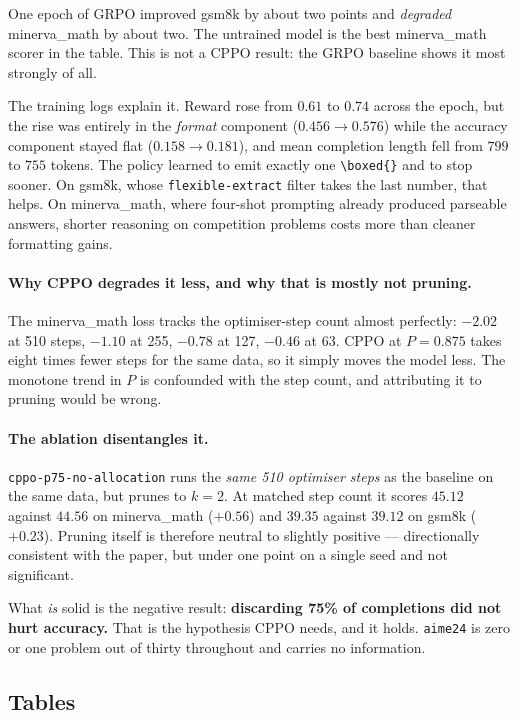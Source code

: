 \documentclass[11pt,a4paper]{article}
\begin{document}
One epoch of GRPO improved gsm8k by about two points and \emph{degraded}
minerva\_math by about two. The untrained model is the best minerva\_math
scorer in the table. This is not a CPPO result: the GRPO baseline shows it most
strongly of all.

The training logs explain it. Reward rose from $0.61$ to $0.74$ across the
epoch, but the rise was entirely in the \emph{format} component
($0.456 \to 0.576$) while the accuracy component stayed flat
($0.158 \to 0.181$), and mean completion length fell from $799$ to $755$
tokens. The policy learned to emit exactly one \verb|\boxed{}| and to stop
sooner. On gsm8k, whose \texttt{flexible-extract} filter takes the last number,
that helps. On minerva\_math, where four-shot prompting already produced
parseable answers, shorter reasoning on competition problems costs more than
cleaner formatting gains.

\paragraph{Why CPPO degrades it less, and why that is mostly not pruning.} The
minerva\_math loss tracks the optimiser-step count almost perfectly: $-2.02$ at
510 steps, $-1.10$ at 255, $-0.78$ at 127, $-0.46$ at 63. CPPO at $P = 0.875$
takes eight times fewer steps for the same data, so it simply moves the model
less. The monotone trend in $P$ is confounded with the step count, and
attributing it to pruning would be wrong.

\paragraph{The ablation disentangles it.} \texttt{cppo-p75-no-allocation} runs
the \emph{same 510 optimiser steps} as the baseline on the same data, but
prunes to $k = 2$. At matched step count it scores $45.12$ against $44.56$ on
minerva\_math ($+0.56$) and $39.35$ against $39.12$ on gsm8k ($+0.23$). Pruning
itself is therefore neutral to slightly positive --- directionally consistent
with the paper, but under one point on a single seed and not significant.

What \emph{is} solid is the negative result: \textbf{discarding 75\% of
completions did not hurt accuracy.} That is the hypothesis CPPO needs, and it
holds. \texttt{aime24} is zero or one problem out of thirty throughout and
carries no information.

\subsection{Tables}
\label{sec:results-tables}
\end{document}
